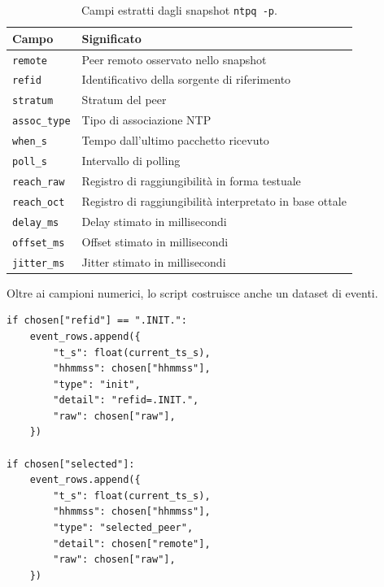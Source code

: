 \begin{table}[H]
  \centering
  \begin{tabular}{ll}
    \hline
    \textbf{Campo} & \textbf{Significato} \\
    \hline
    \texttt{remote} & Peer remoto osservato nello snapshot \\
    \texttt{refid} & Identificativo della sorgente di riferimento \\
    \texttt{stratum} & Stratum del peer \\
    \texttt{assoc\_type} & Tipo di associazione NTP \\
    \texttt{when\_s} & Tempo dall'ultimo pacchetto ricevuto \\
    \texttt{poll\_s} & Intervallo di polling \\
    \texttt{reach\_raw} & Registro di raggiungibilità in forma testuale \\
    \texttt{reach\_oct} & Registro di raggiungibilità interpretato in base ottale \\
    \texttt{delay\_ms} & Delay stimato in millisecondi \\
    \texttt{offset\_ms} & Offset stimato in millisecondi \\
    \texttt{jitter\_ms} & Jitter stimato in millisecondi \\
    \hline
  \end{tabular}
  \caption{Campi estratti dagli snapshot \texttt{ntpq -p}.}
  \label{tab:ntpsec-fields}
\end{table}

Oltre ai campioni numerici, lo script costruisce anche un dataset di eventi.

\begin{listing}[H]
\begin{verbatim}
if chosen["refid"] == ".INIT.":
    event_rows.append({
        "t_s": float(current_ts_s),
        "hhmmss": chosen["hhmmss"],
        "type": "init",
        "detail": "refid=.INIT.",
        "raw": chosen["raw"],
    })

if chosen["selected"]:
    event_rows.append({
        "t_s": float(current_ts_s),
        "hhmmss": chosen["hhmmss"],
        "type": "selected_peer",
        "detail": chosen["remote"],
        "raw": chosen["raw"],
    })
\end{verbatim}
\caption{Eventi estratti dagli snapshot NTPsec.}
\label{lst:ntpsec-events}
\end{listing}


